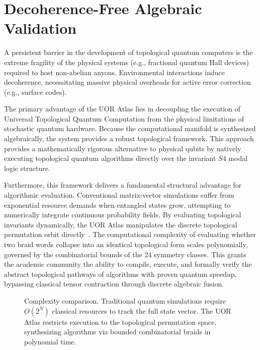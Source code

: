 \section{Decoherence-Free Algebraic Validation}

A persistent barrier in the development of topological quantum computers is the extreme fragility of the physical systems (e.g., fractional quantum Hall devices) required to host non-abelian anyons. Environmental interactions induce decoherence, necessitating massive physical overheads for active error correction (e.g., surface codes).

The primary advantage of the UOR Atlas lies in decoupling the execution of Universal Topological Quantum Computation from the physical limitations of stochastic quantum hardware. Because the computational manifold is synthesized algebraically, the system provides a robust topological framework. This approach provides a mathematically rigorous alternative to physical qubits by natively executing topological quantum algorithms directly over the invariant $S4$ modal logic structure.

Furthermore, this framework delivers a fundamental structural advantage for algorithmic evaluation. Conventional matrix-vector simulations suffer from exponential resource demands when entangled states grow, attempting to numerically integrate continuous probability fields. By evaluating topological invariants dynamically, the UOR Atlas manipulates the discrete topological permutation orbit directly~\cite{boixo2018}. The computational complexity of evaluating whether two braid words collapse into an identical topological form scales polynomially, governed by the combinatorial bounds of the 24 symmetry classes. This grants the academic community the ability to compile, execute, and formally verify the abstract topological pathways of algorithms with proven quantum speedup, bypassing classical tensor contraction through discrete algebraic fusion.

\begin{figure}[h]
\centering
{}
\caption{Complexity comparison. Traditional quantum simulations require $O(2^N)$ classical resources to track the full state vector. The UOR Atlas restricts execution to the topological permutation space, synthesizing algorithms via bounded combinatorial braids in polynomial time.}
\label{fig:complexity}
\end{figure}
